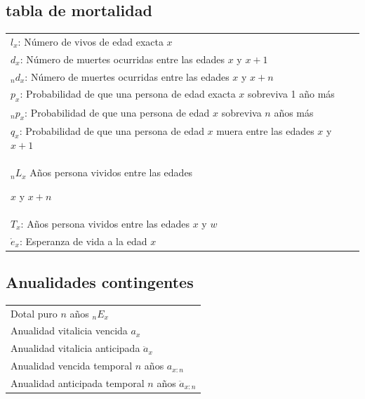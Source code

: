 \documentclass{article}
\numberwithin{equation}{section}
\theoremstyle{plain}  %
\begin{document}
\subsection{tabla de mortalidad}
\begin{tabular}{|l|}
\hline
$l_{x}$: Número de vivos de edad exacta $x$\\
$d_{x}$: Número de muertes ocurridas entre
las edades $x$ y $x+1$\\
${}_nd_{x}$: Número de muertes ocurridas entre
las edades $x$ y $x+n$\\
$p_{x}$: Probabilidad de que una persona de edad
exacta $x$ sobreviva 1 año más\\
${}_np_{x}$: Probabilidad de que una persona de
edad $x$ sobreviva $n$ años más\\
$q_{x}$: Probabilidad de que una persona de edad
$x$ muera entre las edades $x$ y $x+1$\\
${}_nL_{x}$ Años  persona  vividos entre las edades

$x$ y $x+n$\\

$T_x$: Años persona vividos entre las edades $x$
y $w$\\
$\mathring{e}_x$: Esperanza de vida a la edad $x$\\ \hline
\end{tabular}
\subsection{Anualidades contingentes}
\begin{tabular}{|l|}
\hline
Dotal puro $n$ años ${}_nE_x$\\
Anualidad vitalicia vencida $a_x$\\
Anualidad vitalicia anticipada
$\ddot{a}_x$\\
Anualidad vencida temporal $n$
años 
$a_{x:n}$\\
Anualidad anticipada temporal $n$
años $\ddot{a}_{x:n}$ \\ \hline
\end{tabular}
\newpage 
\end{document}
